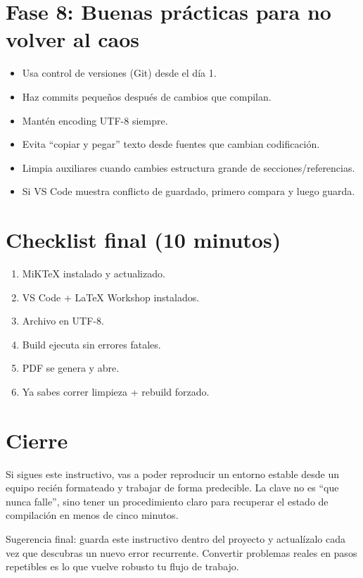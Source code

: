 \documentclass[11pt]{article}
\begin{document}
\section{Fase 8: Buenas pr\'acticas para no volver al caos}
\begin{itemize}
  \item Usa control de versiones (Git) desde el d\'ia 1.
  \item Haz commits peque\~nos despu\'es de cambios que compilan.
  \item Mant\'en encoding UTF-8 siempre.
  \item Evita ``copiar y pegar'' texto desde fuentes que cambian codificaci\'on.
  \item Limpia auxiliares cuando cambies estructura grande de secciones/referencias.
  \item Si VS Code muestra conflicto de guardado, primero compara y luego guarda.
\end{itemize}

\section{Checklist final (10 minutos)}
\begin{enumerate}
  \item MiKTeX instalado y actualizado.
  \item VS Code + LaTeX Workshop instalados.
  \item Archivo en UTF-8.
  \item Build ejecuta sin errores fatales.
  \item PDF se genera y abre.
  \item Ya sabes correr limpieza + rebuild forzado.
\end{enumerate}

\section{Cierre}
Si sigues este instructivo, vas a poder reproducir un entorno estable desde un equipo reci\'en formateado y trabajar de forma predecible. La clave no es ``que nunca falle'', sino tener un procedimiento claro para recuperar el estado de compilaci\'on en menos de cinco minutos.

\vspace{1em}
\noindent
Sugerencia final: guarda este instructivo dentro del proyecto y actual\'izalo cada vez que descubras un nuevo error recurrente. Convertir problemas reales en pasos repetibles es lo que vuelve robusto tu flujo de trabajo.
\end{document}
